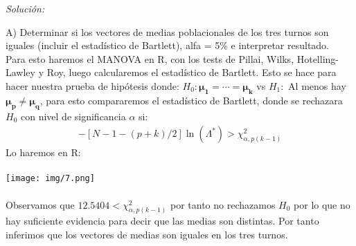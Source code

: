 \documentclass[12pt]{article}
\newenvironment{sol}
    {\emph{Solución:}
    }
    {
    }
\begin{document}
\begin{sol}
A) Determinar si los vectores de medias poblacionales de los tres turnos son iguales (incluir el
estadístico de Bartlett), alfa = 5\% e interpretar resultado.\\
Para esto haremos el MANOVA en R, con los tests de Pillai, Wilks, Hotelling-Lawley y Roy, luego calcularemos el estadístico de Bartlett. Esto se hace para hacer nuestra prueba de hipótesis donde:
$H_0:\bm{\mu_1}=\cdots = \bm{\mu_k}$ vs $H_1:$ Al menos hay $\bm{\mu_p} \neq \bm{\mu_q}$, para esto compararemos el estadístico de Bartlett, donde se rechazara $H_0$ con nivel de significancia $\alpha$ si:
\begin{align*}
-[N-1-(p+k)/2]\ln{(\Lambda^*)}>\chi_{\alpha,p(k-1)}^2
\end{align*}
Lo haremos en R:\\\\
\texttt{[image: img/7.png]}\\\\
Observamos que $12.5404 < \chi_{\alpha,p(k-1)}^2$ por tanto no rechazamos $H_0$ por lo que no hay suficiente evidencia para decir que las medias son distintas. Por tanto inferimos que los vectores de medias son iguales en los tres turnos. 

\pagebreak


\end{sol}
\end{document}
